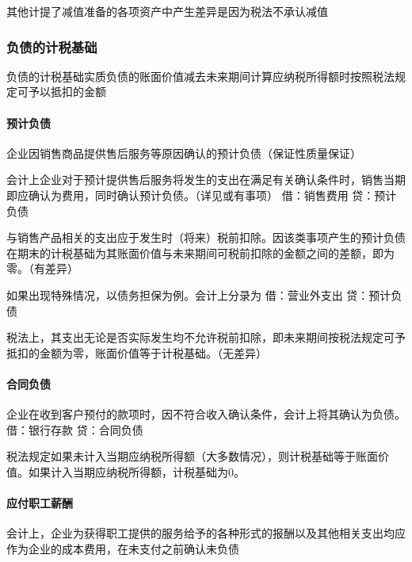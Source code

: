 \documentclass[UTF8,12pt]{ctexart}
\numberwithin{equation}{section} %
\numberwithin{figure}{section}
\numberwithin{table}{section}
\begin{document}
	其他计提了减值准备的各项资产中产生差异是因为税法不承认减值
	
	\subsubsection{负债的计税基础}
	负债的计税基础实质负债的账面价值减去未来期间计算应纳税所得额时按照税法规定可予以抵扣的金额
	
	\paragraph{预计负债}
	企业因销售商品提供售后服务等原因确认的预计负债（保证性质量保证）
	
	会计上企业对于预计提供售后服务将发生的支出在满足有关确认条件时，销售当期即应确认为费用，同时确认预计负债。（详见或有事项）
	借：销售费用 贷：预计负债
	
	与销售产品相关的支出应于发生时（将来）税前扣除。因该类事项产生的预计负债在期末的计税基础为其账面价值与未来期间可税前扣除的金额之间的差额，即为零。（有差异）
	
	如果出现特殊情况，以债务担保为例。会计上分录为
	借：营业外支出
	贷：预计负债
	
	税法上，其支出无论是否实际发生均不允许税前扣除，即未来期间按税法规定可予抵扣的金额为零，账面价值等于计税基础。（无差异）
	
	\paragraph{合同负债}
	企业在收到客户预付的款项时，因不符合收入确认条件，会计上将其确认为负债。
	借：银行存款
	贷：合同负债
	
	税法规定如果未计入当期应纳税所得额（大多数情况），则计税基础等于账面价值。如果计入当期应纳税所得额，计税基础为0。
	
	\paragraph{应付职工薪酬}
	会计上，企业为获得职工提供的服务给予的各种形式的报酬以及其他相关支出均应作为企业的成本费用，在未支付之前确认未负债
	
\end{document}
